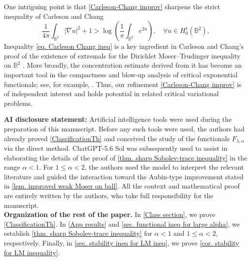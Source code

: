 \documentclass[11pt,a4paper,twoside]{amsart}
\newtheorem{sketch proof}{Sketch of the proof}[section]
\begin{document}
    One intriguing point is that \cref{Carleson-Chang improv} sharpens the  strict inequality of Carleson and Chang \cite{CC86} %
        \begin{equation}
        \label{eq. Carleson Chang ineq}
            \frac{1}{4\pi}
        \int_{\mathbb{B}^2}|\nabla u|^2
        +1
        >
        \log\left(\frac{1}{\pi}\int_{\mathbb{B}^2}e^{2u}\right),\quad \forall u\in H_0^1(\mathbb{B}^2),
        \end{equation}
        Inequality \cref{eq. Carleson Chang ineq} is a key ingredient in Carleson and Chang's proof of the existence of extremals for the Dirichlet Moser--Trudinger inequality on $\mathbb{B}^2$ \cite{CC86}. More broadly, the concentration estimate derived from it has become an important tool in the compactness and blow-up analysis of critical exponential functionals; see, for example, \cite{Flu92,Yan16,IulaMancini2017}. Thus, our refinement \cref{Carleson-Chang improv} is of independent interest and holds potential  in related critical variational problems.
        
        \vspace{1em}

        {\bf AI disclosure statement:} Artificial intelligence tools were used during the preparation of this manuscript.
        Before any such tools were used, the authors had already proved \cref{ClassificationTh} and conceived the study of the functionals $F_{\lambda,\alpha}$ via the direct method. 
        ChatGPT-5.6 Sol was subsequently used to assist in elaborating the details of the proof of \cref{thm. sharp Sobolev-trace inequality} in the range $\alpha<1$. For $1\leq\alpha<2$, the authors used the model to interpret the relevant literature and guided the interaction toward the Aubin-type improvement stated in \cref{lem. improved weak Moser on ball}.                
         All the context and mathematical proof are entirely written by the authors, who take full responsibility for the manuscript.\\
         
        \noindent\textbf{Organization of the rest of the paper.} In \cref{Class section}, we prove  \cref{ClassificationTh}. In \cref{App results} and \cref{sec. functional ineq for large alpha}, we establish \cref{thm. sharp Sobolev-trace inequality} for $\alpha<1$ and $1\leq \alpha<2$, respectively.
        Finally, in \cref{sec. stability ineq for LM ineq},
        we prove \cref{cor. stability for LM inequality}.
\end{document}

